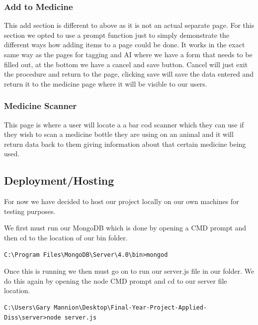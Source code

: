 \documentclass[12pt,a4paper,oneside,openany]{book}
\begin{document}
\subsubsection{Add to Medicine}
This add section is different to above as it is not an actual separate page. For this section we opted to use a prompt function just to simply demonstrate the different ways how adding items to a page could be done. It works in the exact same way as the pages for tagging and AI where we have a form that needs to be filled out, at the bottom we have a cancel and save button. Cancel will just exit the procedure and return to the page, clicking save will save the data entered and return it to the medicine page where it will be visible to our users.

\subsubsection{Medicine Scanner}
This page is where a user will locate a a bar cod scanner which they can use if they wish to scan a medicine bottle they are using on an animal and it will return data back to them giving information about that certain medicine being used.



\subsection{Deployment/Hosting}
For now we have decided to host our project locally on our own machines for testing purposes.

We first must run our MongoDB which is done by opening a CMD prompt and then cd to the location of our bin folder.
\begin{verbatim}
C:\Program Files\MongoDB\Server\4.0\bin>mongod
\end{verbatim}

Once this is running we then must go on to run our server.js file in our folder. We do this again by opening the node CMD prompt and cd to our server file location.
\begin{verbatim}
C:\Users\Gary Mannion\Desktop\Final-Year-Project-Applied-Diss\server>node server.js
\end{verbatim}
\end{document}
